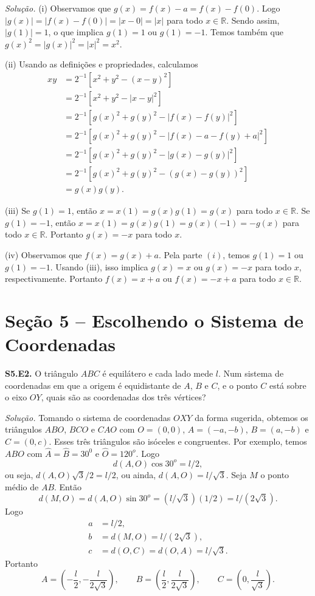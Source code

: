 \documentclass[a4paper,11pt]{article}
\newcommand{\R}{\mathbb{R}}
\begin{document}
\vspace{\baselineskip}

\emph{Solução.}
(i)
Observamos que $g(x) = f(x) - a = f(x) - f(0)$.
Logo $|g(x)| = |f(x)-f(0)| = |x-0| = |x|$ para todo $x \in \R$.
Sendo assim, $|g(1)| = 1$, o que implica $g(1) = 1$ ou $g(1) = -1$.
Temos também que $g(x)^2 = |g(x)|^2 = |x|^2 = x^2$.

(ii)
Usando as definições e propriedades, calculamos
\begin{align*}
  xy & = 2^{-1} [x^2 + y^2 - (x-y)^2 ] \\
  & = 2^{-1} [ x^2 + y^2 - |x-y|^2 ] \\
  & = 2^{-1} [ g(x)^2 + g(y)^2 - |f(x) - f(y)|^2 ] \\
  & = 2^{-1} [ g(x)^2 + g(y)^2 - |f(x) - a - f(y) + a|^2 ] \\
  & = 2^{-1} [ g(x)^2 + g(y)^2 - |g(x) - g(y)|^2 ] \\
  & = 2^{-1} [ g(x)^2 + g(y)^2 - (g(x) - g(y))^2 ] \\
  & = g(x)g(y).
\end{align*}

(iii)
Se $g(1)=1$, então $x = x(1) = g(x)g(1) = g(x)$ para todo $x \in \R$.
Se $g(1)=-1$, então $x = x(1) = g(x)g(1) = g(x)(-1) = -g(x)$ para todo $x \in \R$.
Portanto $g(x) = -x$ para todo $x$.

(iv)
Observamos que $f(x) = g(x) + a$.
Pela parte $(i)$, temos $g(1) = 1$ ou $g(1) = -1$.
Usando (iii), isso implica $g(x)=x$ ou $g(x) = -x$ para todo $x$, respectivamente.
Portanto $f(x) = x + a$ ou $f(x) = -x + a$ para todo $x \in \R$.

\section*{Seção 5 -- Escolhendo o Sistema de Coordenadas}

\textbf{S5.E2.}
O triângulo $ABC$ é equilátero e cada lado mede $l$.
Num sistema de coordenadas em que a origem é equidistante de $A$, $B$ e $C$, e o ponto $C$ está sobre o eixo $OY$, quais são as coordenadas dos três vértices?

\vspace{\baselineskip}

\emph{Solução.}
Tomando o sistema de coordenadas $OXY$ da forma sugerida, obtemos os triângulos $ABO$, $BCO$ e $CAO$ com $O = (0,0)$, $A = (-a,-b)$, $B = (a,-b)$ e $C = (0,c)$.
Esses três triângulos são isóceles e congruentes.
Por exemplo, temos $ABO$ com $\hat{A} = \hat{B} = 30^0$ e $\hat{O} = 120^o$.
Logo
\[
  d(A,O) \cos 30^o = l/2,
\]
ou seja, $d(A,O) \sqrt{3}/2 = l/2$, ou ainda, $d(A,O) = l/\sqrt{3}$.
Seja $M$ o ponto médio de $AB$.
Então
\[
  d(M,O) = d(A,O) \sin 30^o = (l/\sqrt{3})(1/2) = l/(2\sqrt{3}).
\]
Logo
\begin{align*}
  a & = l/2, \\
  b & = d(M,O) = l/(2\sqrt{3}), \\
  c & = d(O,C) = d(O,A) = l/\sqrt{3}.
\end{align*}
Portanto
\[
  A = \left(-\frac{l}{2}, -\frac{l}{2\sqrt{3}} \right), \qquad B = \left( \frac{l}{2}, \frac{l}{2\sqrt{3}} \right), \qquad C = \left(0, \frac{l}{\sqrt{3}} \right).
\]
\end{document}
